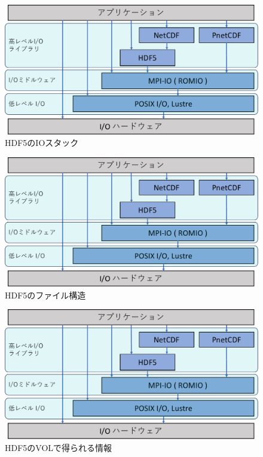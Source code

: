 \documentclass[submit,techrep,noauthor]{ipsj}
\begin{document}
\begin{figure}[t]
	\centering
	\includegraphics[page=7,width=\linewidth]{figure-crop.pdf}
	\caption{HDF5のIOスタック}
	\label{fig:hdf5stack}
\end{figure}

\begin{figure}[t]
	\centering
	\includegraphics[page=13,width=\linewidth]{figure-crop.pdf}
	\caption{HDF5のファイル構造}
	\label{fig:hdf5file}
\end{figure}

\begin{figure}[t]
	\centering
	\includegraphics[page=16,width=\linewidth]{figure-crop.pdf}
	\caption{HDF5のVOLで得られる情報}
	\label{fig:hdf5infoinvol}
\end{figure}
\end{document}
